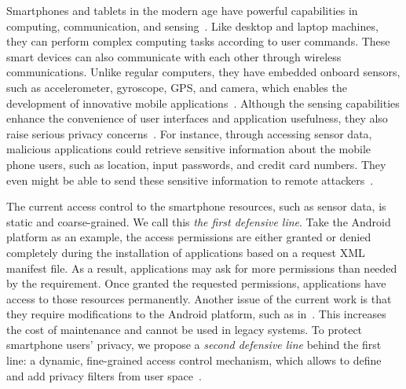 \begin{comment}
We propose to develop \sysname that will unleash the potential of
tablets and smartphones. 
Drawing on our experience (and user base) from our
Seattle platform, \sysname will control access to computational sandboxes
that runs unintrusively in the background of the tablets and smartphones of
users around the world.   
Any researcher can quickly and use the \sysname to easily access 
resources across a huge and diverse set of smartphones and tablets.   
(In fact thousands of researchers are already using our current 
testbed~\cite{SeattleClearinghouse}.)
This will provide unprecedented access to information about 
wireless access networks in diverse geographic regions, 
community roles and environmental impacts of individuals, 
and social patterns people  all around the world.
As a result, the \sysname will provide unparalleled research
capabilities for scientists and researchers across a wide variety of fields
\end{comment}

Smartphones and tablets in the modern age have powerful capabilities in
computing, communication, and sensing~\cite{cai2009defending}. Like desktop and
laptop machines, they can perform complex computing tasks according to user
commands. These smart devices can also communicate with each other through
wireless communications. Unlike regular computers, they have embedded
onboard sensors, such as accelerometer, gyroscope, GPS, and camera, which
enables the development of innovative mobile applications~\cite{sensor}.
Although the sensing capabilities enhance the convenience of user interfaces and
application usefulness, they also raise serious privacy
concerns~\cite{shabtai2010google}. For instance, through accessing sensor data,
malicious applications could retrieve sensitive information about the mobile
phone users, such as location, input passwords, and credit card numbers. They
even might be able to send these sensitive information to remote
attackers~\cite{xu2012taplogger, miluzzo2012tapprints, xu2009stealthy,
schlegel2011soundcomber, cai2011touchlogger, marquardt2011sp}. 

The current access control to the smartphone resources, such as sensor data, is
static and coarse-grained. We call this \textit{the first defensive line}. Take
the Android platform as an example, the access permissions are either granted or
denied completely during the installation of applications based on a request XML
manifest file. As a result, applications may ask for more permissions than
needed by the requirement. Once granted the requested permissions, applications
have access to those resources permanently. Another issue of the current work is
that they require modifications to the Android platform, such as
in~\cite{conti2011crepe, hornyack2011these}. This increases the cost of
maintenance and cannot be used in legacy systems. To protect smartphone
users' privacy, we propose a \textit{second defensive line} behind the first
line: a dynamic, fine-grained access control mechanism, which allows to
define and add privacy filters from user space~\cite{blur, Cappos_CCS_10}.



